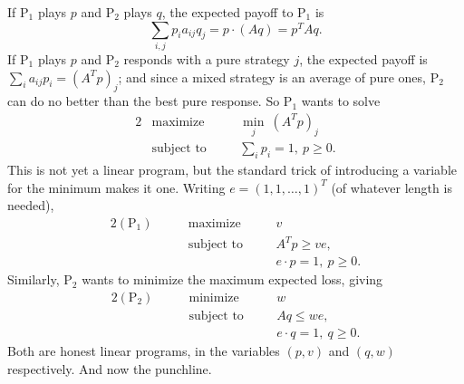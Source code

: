 \documentclass[a4paper]{scrartcl}
\begin{document}
If $\mathrm{P}_1$ plays $p$ and $\mathrm{P}_2$ plays $q$, the expected payoff to $\mathrm{P}_1$ is
$$
\sum_{i,j}p_i a_{ij}q_j = p\cdot(Aq) = p^TAq.
$$
If $\mathrm{P}_1$ plays $p$ and $\mathrm{P}_2$ responds with a pure strategy $j$, the expected payoff is $\sum_i a_{ij}p_i = (A^Tp)_j$; and since a mixed strategy is an average of pure ones, $\mathrm{P}_2$ can do no better than the best pure response. So $\mathrm{P}_1$ wants to solve
\begin{alignat*}{2}
    & \text{maximize} \quad && \min_{j}\ (A^Tp)_j\\
    & \text{subject to} \quad && \textstyle\sum_i p_i = 1,\ p \geq 0.
\end{alignat*}
This is not yet a linear program, but the standard trick of introducing a variable for the minimum makes it one. Writing $e = (1,1,\dots,1)^T$ (of whatever length is needed),
\begin{alignat*}{2}
    (\mathrm{P}_1) \qquad & \text{maximize} \quad && v \\
    & \text{subject to} \quad && A^Tp \geq ve,\\
    & && e\cdot p = 1,\ p \geq 0.
\end{alignat*}
Similarly, $\mathrm{P}_2$ wants to minimize the maximum expected loss, giving
\begin{alignat*}{2}
    (\mathrm{P}_2) \qquad & \text{minimize} \quad && w \\
    & \text{subject to} \quad && Aq \leq we,\\
    & && e\cdot q = 1,\ q \geq 0.
\end{alignat*}
Both are honest linear programs, in the variables $(p, v)$ and $(q, w)$ respectively. And now the punchline.
\end{document}
